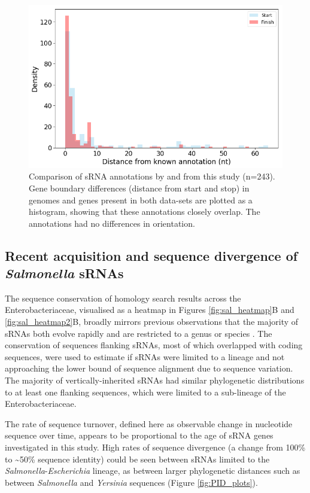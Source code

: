 \begin{figure}[H]
    \includegraphics[scale=0.6]{sal/start_finish.png}    
    \caption[Comparison of sRNA annotations by \cite{Richter2012-uuuuiu} and from this study]{Comparison of sRNA annotations by \cite{Richter2012-uuuuiu} and from this study (n=243). Gene boundary differences (distance from start and stop) in genomes and genes present in both data-sets are plotted as a histogram, showing that these annotations closely overlap. The annotations had no differences in orientation.}
    \label{fig:start_finish}
\end{figure}

\subsection{Recent acquisition and sequence divergence of \textit{Salmonella} sRNAs }

The sequence conservation of homology search results across the Enterobacteriaceae, visualised as a heatmap in Figures \ref{fig:sal_heatmap}B and \ref{fig:sal_heatmap2}B, broadly mirrors previous observations that the majority of sRNAs both evolve rapidly and are restricted to a genus or species \citep{Gomez-Lozano2015-yx,Gottesman2011-vx,Skippington2012-iv}. 
The conservation of sequences flanking sRNAs, most of which overlapped with coding sequences, were used to estimate if sRNAs were limited to a lineage and not approaching the lower bound of sequence alignment due to sequence variation. The majority of vertically-inherited sRNAs had similar phylogenetic distributions to at least one flanking sequences, which were limited to a sub-lineage of the Enterobacteriaceae. 

The rate of sequence turnover, defined here as observable change in nucleotide sequence over time, appears to be proportional to the age of sRNA genes investigated in this study. High rates of sequence divergence (a change from 100\% to \textasciitilde50\% sequence identity) could be seen between sRNAs limited to the  \textit{Salmonella}-\textit{Escherichia} lineage, as between larger phylogenetic distances such as between \textit{Salmonella} and \textit{Yersinia} sequences (Figure \ref{fig:PID_plots}). 

